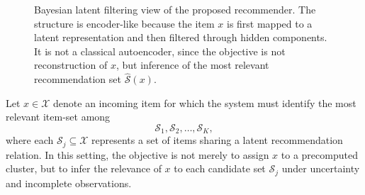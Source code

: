 \documentclass{article}
\begin{document}
\begin{figure}[t]
	\caption{Bayesian latent filtering view of the proposed recommender. The structure is encoder-like because the item \(x\) is first mapped to a latent representation and then filtered through hidden components. It is not a classical autoencoder, since the objective is not reconstruction of \(x\), but inference of the most relevant recommendation set \(\widehat{\mathcal{S}}(x)\).}
	\label{fig:bayesian_latent_filtering}
\end{figure}


























Let \(x\in\mathcal{X}\) denote an incoming item for which the system must identify the most relevant item-set among
\[
\mathcal{S}_1,\mathcal{S}_2,\ldots,\mathcal{S}_K,
\]
where each \(\mathcal{S}_j\subseteq\mathcal{X}\) represents a set of items sharing a latent recommendation relation. In this setting, the objective is not merely to assign \(x\) to a precomputed cluster, but to infer the relevance of \(x\) to each candidate set \(\mathcal{S}_j\) under uncertainty and incomplete observations.
\end{document}
